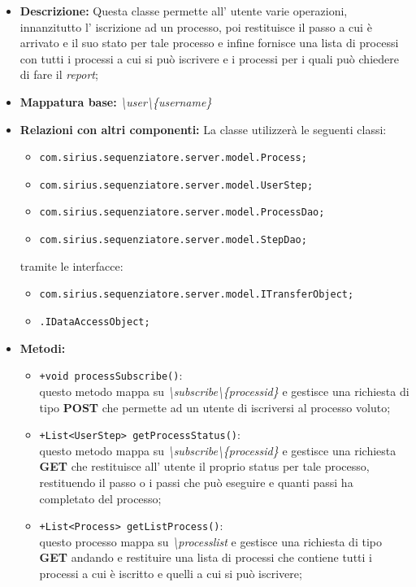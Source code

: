 \begin{itemize}
	\item \textbf{Descrizione: } Questa classe permette all' utente varie operazioni, innanzitutto l' iscrizione ad un processo, poi restituisce il passo a cui è arrivato e il suo stato per tale processo e infine fornisce una lista di processi con tutti i processi a cui si può iscrivere e i processi per i quali può chiedere di fare il \textit{report};
	\item \textbf{Mappatura base: } \textit{\textbackslash user\textbackslash \{username\}}
	\item \textbf{Relazioni con altri componenti: }
	La classe utilizzerà le seguenti classi:
	\begin{itemize}
		\item \texttt{com.sirius.sequenziatore.server.model.Process;}
		\item \texttt{com.sirius.sequenziatore.server.model.UserStep;}
		\item \texttt{com.sirius.sequenziatore.server.model.ProcessDao;}
		\item \texttt{com.sirius.sequenziatore.server.model.StepDao;}
	\end{itemize}
	tramite le interfacce:
	\begin{itemize}
		\item \texttt{com.sirius.sequenziatore.server.model.ITransferObject;}
		\item \texttt{\sModel .IDataAccessObject;}
	\end{itemize}
	\item \textbf{Metodi: }\begin{itemize}
					\item \texttt{+void processSubscribe()}:\\
					questo metodo mappa su \textit{\textbackslash subscribe\textbackslash \{processid\}} e gestisce una richiesta di tipo \textbf{POST} che permette ad un utente di iscriversi al processo voluto;
					\item \texttt{+List<UserStep> getProcessStatus()}:\\
					questo metodo mappa su \textit{\textbackslash subscribe\textbackslash \{processid\}} e gestisce una richiesta \textbf{GET} che restituisce all' utente il proprio status per tale processo, restituendo il passo o i passi che può eseguire e quanti passi ha completato del processo;
					\item \texttt{+List<Process> getListProcess()}:\\
					questo processo mappa su \textit{\textbackslash processlist} e gestisce una richiesta di tipo \textbf{GET} andando e restituire una lista di processi che contiene tutti i processi  a cui è iscritto e quelli a cui si può iscrivere;
				\end{itemize}
\end{itemize}
